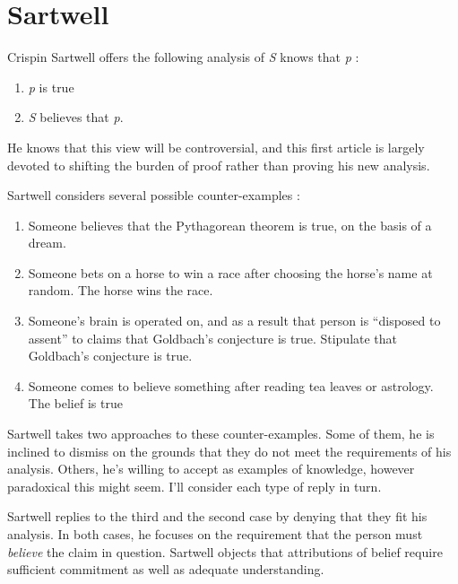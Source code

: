 \section{Sartwell}


Crispin Sartwell offers the following analysis of \textit{S} knows that \textit{p} \parencite[157]{sartwell1991}:

\begin{enumerate}
    \item \textit{p} is true
    \item \textit{S} believes that \textit{p}.
\end{enumerate}

He knows that this view will be controversial, and this first article is largely devoted to shifting the burden of proof rather than proving his new analysis.

Sartwell considers several possible counter-examples \parencite[158--159]{sartwell1991}:

\begin{enumerate}
    \item Someone believes that the Pythagorean theorem is true, on the basis of a dream.
    \item Someone bets on a horse to win a race after choosing the horse's name at random. The horse wins the race.
    \item Someone's brain is operated on, and as a result that person is ``disposed to assent'' to claims that Goldbach's conjecture is true. Stipulate that Goldbach's conjecture is true.
    \item Someone comes to believe something after reading tea leaves or astrology. The belief is true
\end{enumerate}

Sartwell takes two approaches to these counter-examples. Some of them, he is inclined to dismiss on the grounds that they do not meet the requirements of his analysis. Others, he's willing to accept as examples of knowledge, however paradoxical this might seem. I'll consider each type of reply in turn.

Sartwell replies to the third and the second case by denying that they fit his analysis. In both cases, he focuses on the requirement that the person must \textit{believe} the claim in question. Sartwell objects that attributions of belief require sufficient commitment as well as adequate understanding.

